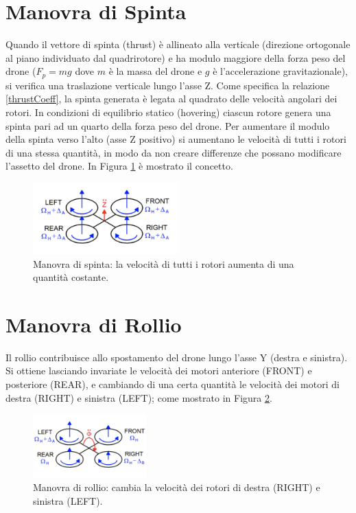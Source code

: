 \section*{Manovra di Spinta}
Quando il vettore di spinta (thrust) è allineato alla verticale (direzione ortogonale al piano individuato dal quadrirotore) e ha modulo maggiore della forza peso del drone ($F_p = mg$ dove $m$ è la massa del drone e $g$ è l'accelerazione gravitazionale), si verifica una traslazione verticale lungo l'asse Z. Come specifica la relazione \ref{thrustCoeff}, la spinta generata è legata al quadrato delle velocità angolari dei rotori. In condizioni di equilibrio statico (hovering) ciascun rotore genera una spinta pari ad un quarto della forza peso del drone. Per aumentare il modulo della spinta verso l'alto (asse Z positivo) si aumentano le velocità di tutti i rotori di una stessa quantità, in modo da non creare differenze che possano modificare l'assetto del drone. In Figura \ref{fig:thrust_quad} è mostrato il concetto.

\begin{figure}[H]
    \centering
    \includegraphics[width=0.5\textwidth]{gfx/thrust_quad}
    \caption[Manovra di spinta di un quadrirotore.]{Manovra di spinta: la velocità di tutti i rotori aumenta di una quantità costante.}
    \label{fig:thrust_quad}
\end{figure}

\section*{Manovra di Rollio}
Il rollio contribuisce allo spostamento del drone lungo l'asse Y (destra e sinistra). Si ottiene lasciando invariate le velocità dei motori anteriore (FRONT) e posteriore (REAR), e cambiando di una certa quantità le velocità dei motori di destra (RIGHT) e sinistra (LEFT); come mostrato in Figura \ref{fig:roll_quad}.

\begin{figure}[H]
    \centering
    \includegraphics[width=0.39\textwidth]{gfx/roll_quad}
    \caption[Manovra di rollio di un quadrirotore.]{Manovra di rollio: cambia la velocità dei rotori di destra (RIGHT) e sinistra (LEFT).}
    \label{fig:roll_quad}
\end{figure}

